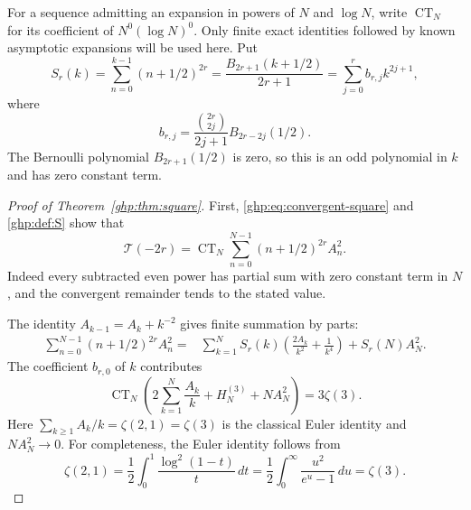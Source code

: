 For a sequence admitting an expansion in powers of $N$ and $\log N$,
write $\operatorname{CT}_N$ for its coefficient of $N^0(\log N)^0$.
Only finite exact identities followed by known asymptotic expansions
will be used here. Put
\begin{equation}\label{ghp:def:S}
 S_r(k)=\sum_{n=0}^{k-1}(n+1/2)^{2r}
  =\frac{B_{2r+1}(k+1/2)}{2r+1}
  =\sum_{j=0}^r b_{r,j}k^{2j+1},
\end{equation}
where
\begin{equation}\label{ghp:def:b}
 b_{r,j}=\frac{\binom{2r}{2j}}{2j+1}B_{2r-2j}(1/2).
\end{equation}
The Bernoulli polynomial $B_{2r+1}(1/2)$ is zero, so this is an odd
polynomial in $k$ and has zero constant term.

\begin{proof}[Proof of Theorem~\ref{ghp:thm:square}]
First, \eqref{ghp:eq:convergent-square} and \eqref{ghp:def:S} show that
\begin{equation}\label{ghp:eq:ct-reduction}
 \mathcal T(-2r)=\operatorname{CT}_N
       \sum_{n=0}^{N-1}(n+1/2)^{2r}A_n^2.
\end{equation}
Indeed every subtracted even power has partial sum with zero constant
term in $N$, and the convergent remainder tends to the stated value.

The identity $A_{k-1}=A_k+k^{-2}$ gives finite summation by parts:
\begin{align}\label{ghp:eq:partial-sum}
 \sum_{n=0}^{N-1}(n+1/2)^{2r}A_n^2
 ={}&\sum_{k=1}^N S_r(k)
          \left(\frac{2A_k}{k^2}+\frac1{k^4}\right)
       +S_r(N)A_N^2.
\end{align}
The coefficient $b_{r,0}$ of $k$ contributes
\[
 \operatorname{CT}_N
 \left(2\sum_{k=1}^N\frac{A_k}{k}+H_N^{(3)}+NA_N^2\right)
 =3\zeta(3).
\]
Here $\sum_{k\geq1}A_k/k=\zeta(2,1)=\zeta(3)$ is the classical
Euler identity and $NA_N^2\to0$. For completeness, the Euler identity
follows from
\[
 \zeta(2,1)=\frac12\int_0^1\frac{\log^2(1-t)}t\,dt
 =\frac12\int_0^\infty\frac{u^2}{e^u-1}\,du=\zeta(3).
\]


\end{proof}
